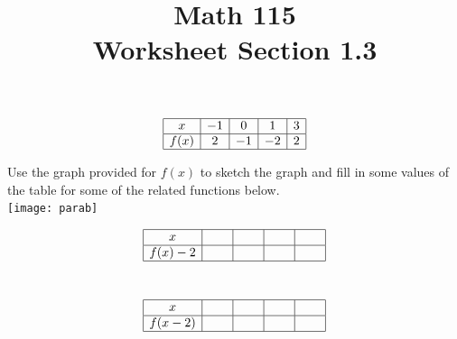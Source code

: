 \documentclass[11pt]{exam}
\title{\vspace{-1.25in} Math 115 \\ Worksheet Section 1.3}
\date{}
\begin{document}
\maketitle
\vspace{-1in}
\begin{questions}
  \question 
  \begin{multicols}{2}
	$$\begin{array}{|c|c|c|c|c|} \hline
            x  & -1 & 0 & 1 & 3 \\ \hline
            f(x)  & 2  & -1 & -2  & 2  \\
            \hline
          \end{array}$$	
	
          Use the graph provided for $f(x)$ to sketch the graph and
          fill in some values of the table for some of the related
          functions below. \\ \texttt{[image: parab]}
\end{multicols}
\vspace{-0.3in}
\begin{multicols}{2}
 $$\begin{array}{|c|c|c|c|c|} \hline
x  & \hspace{.2in} & \hspace{.2in} & \hspace{.2in} & \hspace{.2in} \\ \hline
f(x)-2 &   &  &  &   \\
\hline
\end{array}$$  \\

\end{multicols}
\vspace{-0.3in}
\begin{multicols}{2}
 $$\begin{array}{|c|c|c|c|c|} \hline
x  & \hspace{.2in} & \hspace{.2in} & \hspace{.2in} & \hspace{.2in} \\ \hline
f(x-2) &   &  &  &   \\
\hline
\end{array}$$  \\


\end{multicols}
\end{questions}
\end{document}
